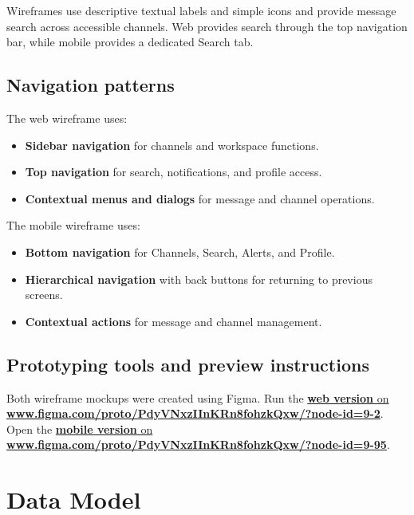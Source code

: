 \documentclass[
    english, %
]{VUMIFPSkursinis}
\begin{document}
Wireframes use descriptive textual labels and simple icons and provide message search across accessible channels. Web provides search through the top navigation bar, while mobile provides a dedicated Search tab.

\subsection{Navigation patterns}

The web wireframe uses:
\begin{itemize}
    \item \textbf{Sidebar navigation} for channels and workspace functions.
    \item \textbf{Top navigation} for search, notifications, and profile access.
    \item \textbf{Contextual menus and dialogs} for message and channel operations.
\end{itemize}

The mobile wireframe uses:
\begin{itemize}
    \item \textbf{Bottom navigation} for Channels, Search, Alerts, and Profile.
    \item \textbf{Hierarchical navigation} with back buttons for returning to previous screens.
    \item \textbf{Contextual actions} for message and channel management.
\end{itemize}

\subsection{Prototyping tools and preview instructions}

Both wireframe mockups were created using Figma. Run the  \href{https://www.figma.com/proto/PdyVNxzIInKRn8fohzkQxw/?node-id=9-2&t=uGHR2VNPcXUkVMGI-1&page-id=1%3A84&starting-point-node-id=9%3A2}{\textbf{web version} on \textbf{www.figma.com/proto/PdyVNxzIInKRn8fohzkQxw/?node-id=9-2}}. Open the  \href{https://www.figma.com/proto/PdyVNxzIInKRn8fohzkQxw/?node-id=9-958&t=h2750Oqgq7jkQqpQ-1&page-id=1%3A1065&starting-point-node-id=9%3A958}{\textbf{mobile version} on \textbf{www.figma.com/proto/PdyVNxzIInKRn8fohzkQxw/?node-id=9-95}}.

\section{Data Model}
\end{document}
